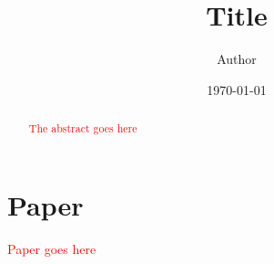 \documentclass[12pt]{article}
\title{Title}
\author{
        Author \\
}
\date{\today}
\newcommand{\note}{\textcolor{red}} %
\begin{document}
\maketitle

\begin{abstract}
\note{The abstract goes here}
\end{abstract}

\section{Paper}
\note{Paper goes here}
\end{document}
